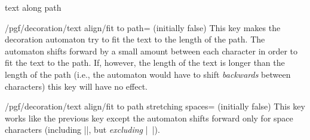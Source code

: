 \begin{decoration}{text along path}
    \begin{key}{/pgf/decoration/text align/fit to path= (initially false)}
        This key makes the decoration automaton try to fit the text to the
        length of the path. The automaton shifts forward by a small amount
        between each character in order to fit the text to the path. If,
        however, the length of the text is longer than the length of the path
        (i.e., the automaton would have to shift \emph{backwards} between
        characters) this key will have no effect.
\begin{codeexample}[preamble={\usetikzlibrary{decorations.text}}]
\end{codeexample}
    \end{key}

    \begin{key}{/pgf/decoration/text align/fit to path stretching spaces= (initially false)}
        This key works like the previous key except the automaton shifts
        forward only for space characters (including |\space|, but
        \emph{excluding} |\ |).
\begin{codeexample}[preamble={\usetikzlibrary{decorations.text}}]
\end{codeexample}
    \end{key}
\end{decoration}


